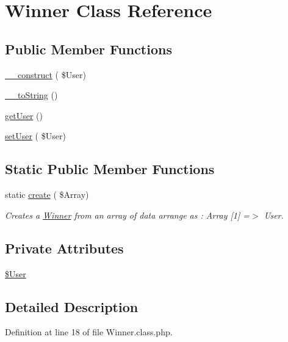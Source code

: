 \hypertarget{class_winner}{}\section{Winner Class Reference}
\label{class_winner}
\subsection*{Public Member Functions}
\begin{DoxyCompactItemize}
\item 
\hyperlink{class_winner_a319b7273e20555bde7adcf799529fc50}{\+\_\+\+\_\+construct} ( \$User)
\item 
\hyperlink{class_winner_a16a7bef9b60aa3d2cf7e01a9404368a8}{\+\_\+\+\_\+to\+String} ()
\item 
\hyperlink{class_winner_ab0e2937fe99a49a34c56e2d7940639c8}{get\+User} ()
\item 
\hyperlink{class_winner_a5501a99056a71ccdbeb69ce4830bff45}{set\+User} ( \$User)
\end{DoxyCompactItemize}
\subsection*{Static Public Member Functions}
\begin{DoxyCompactItemize}
\item 
static \hyperlink{class_winner_a3edae39c7b3078d2c447f44815ad17ea}{create} ( \$Array)
\begin{DoxyCompactList}\small\item\em Creates a \hyperlink{class_winner}{Winner} from an array of data arrange as \+: Array \mbox{[}1\mbox{]} =$>$ User. \end{DoxyCompactList}\end{DoxyCompactItemize}
\subsection*{Private Attributes}
\begin{DoxyCompactItemize}
\item 
\hyperlink{class_winner_a73b088eac6568fc7364c5cef93235419}{\$\+User}
\end{DoxyCompactItemize}


\subsection{Detailed Description}


Definition at line 18 of file Winner.\+class.\+php.




